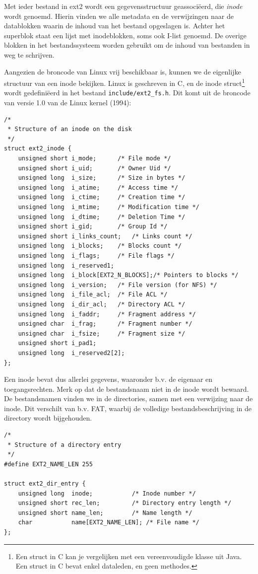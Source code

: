 Met ieder bestand in ext2 wordt een gegevensstructuur geassoci\"eerd, die \emph{inode} wordt genoemd.
Hierin vinden we alle metadata en de verwijzingen naar de datablokken waarin de inhoud
van het bestand opgeslagen is. Achter het superblok staat een lijst met inodeblokken, soms ook
I-list genoemd. De overige blokken in het bestandssysteem worden gebruikt om de inhoud van bestanden
in weg te schrijven.

Aangezien de broncode van Linux vrij beschikbaar is, kunnen we de eigenlijke structuur van een inode
bekijken. Linux is geschreven in C, en de inode struct\footnote{Een struct in C kan je vergelijken
met een vereenvoudigde klasse uit Java. Een struct in C bevat enkel dataleden, en geen methodes.}
wordt gedefini\"eerd in het bestand \verb|include/ext2_fs.h|. Dit komt uit de broncode van versie 1.0
van de Linux kernel (1994):

\begin{verbatim}
/*
 * Structure of an inode on the disk
 */
struct ext2_inode {
    unsigned short i_mode;      /* File mode */
    unsigned short i_uid;       /* Owner Uid */
    unsigned long  i_size;      /* Size in bytes */
    unsigned long  i_atime;     /* Access time */
    unsigned long  i_ctime;     /* Creation time */
    unsigned long  i_mtime;     /* Modification time */
    unsigned long  i_dtime;     /* Deletion Time */
    unsigned short i_gid;       /* Group Id */
    unsigned short i_links_count;   /* Links count */
    unsigned long  i_blocks;    /* Blocks count */
    unsigned long  i_flags;     /* File flags */
    unsigned long  i_reserved1;
    unsigned long  i_block[EXT2_N_BLOCKS];/* Pointers to blocks */
    unsigned long  i_version;   /* File version (for NFS) */
    unsigned long  i_file_acl;  /* File ACL */
    unsigned long  i_dir_acl;   /* Directory ACL */
    unsigned long  i_faddr;     /* Fragment address */
    unsigned char  i_frag;      /* Fragment number */
    unsigned char  i_fsize;     /* Fragment size */
    unsigned short i_pad1;
    unsigned long  i_reserved2[2];
};
\end{verbatim}

Een inode bevat dus allerlei gegevens, waaronder b.v. de eigenaar en toegangsrechten. Merk op
dat de bestandsnaam niet in de inode wordt bewaard. De bestandsnamen vinden we in de directories,
samen met een verwijzing naar de inode. Dit verschilt van b.v. FAT, waarbij de volledige
bestandsbeschrijving in de directory wordt bijgehouden.

\begin{verbatim}
/*
 * Structure of a directory entry
 */
#define EXT2_NAME_LEN 255

struct ext2_dir_entry {
    unsigned long  inode;           /* Inode number */
    unsigned short rec_len;         /* Directory entry length */
    unsigned short name_len;        /* Name length */
    char           name[EXT2_NAME_LEN]; /* File name */
};
\end{verbatim}

